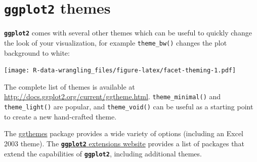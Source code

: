 \documentclass[]{book}
\newenvironment{Shaded}{\begin{snugshade}}{\end{snugshade}}
\newcommand{\DataTypeTok}[1]{\textcolor[rgb]{0.13,0.29,0.53}{#1}}
\newcommand{\KeywordTok}[1]{\textcolor[rgb]{0.13,0.29,0.53}{\textbf{#1}}}
\newcommand{\NormalTok}[1]{#1}
\newcommand{\OperatorTok}[1]{\textcolor[rgb]{0.81,0.36,0.00}{\textbf{#1}}}
\newcommand{\OtherTok}[1]{\textcolor[rgb]{0.56,0.35,0.01}{#1}}
\newcommand{\StringTok}[1]{\textcolor[rgb]{0.31,0.60,0.02}{#1}}
\begin{document}
\hypertarget{ggplot2-themes}{%
\section{\texorpdfstring{\textbf{\texttt{ggplot2}} themes}{ggplot2 themes}}\label{ggplot2-themes}}

\textbf{\texttt{ggplot2}}
comes with several other themes which can be useful to quickly change the look
of your visualization, for example \texttt{theme\_bw()} changes the plot background to white:

\begin{Shaded}
\end{Shaded}

\texttt{[image: R-data-wrangling\_files/figure-latex/facet-theming-1.pdf]}

The complete list of themes is available
at \url{http://docs.ggplot2.org/current/ggtheme.html}. \texttt{theme\_minimal()} and \texttt{theme\_light()} are popular, and \texttt{theme\_void()} can be useful as a starting point to create a new hand-crafted theme.

The \href{https://cran.r-project.org/web/packages/ggthemes/vignettes/ggthemes.html}{ggthemes} package
provides a wide variety of options (including an Excel 2003 theme).
The \href{https://www.ggplot2-exts.org}{\textbf{\texttt{ggplot2}} extensions website} provides a list
of packages that extend the capabilities of \textbf{\texttt{ggplot2}}, including additional themes.
\end{document}
